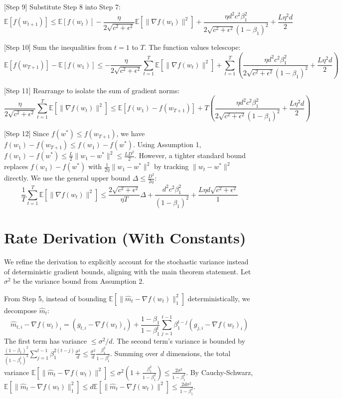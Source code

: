 \documentclass{article}
\begin{document}
[Step 9] Substitute Step 8 into Step 7:
$$ \mathbb{E}[f(w_{t+1})] \leq \mathbb{E}[f(w_t)] - \frac{\eta}{2\sqrt{c^2+\epsilon^2}} \mathbb{E}[\|\nabla f(w_t)\|^2] + \frac{\eta d^2 c^2 \beta_1^2}{2\sqrt{c^2+\epsilon^2}(1-\beta_1)^2} + \frac{L \eta^2 d}{2} $$

[Step 10] Sum the inequalities from $t=1$ to $T$. The function values telescope:
$$ \mathbb{E}[f(w_{T+1})] - \mathbb{E}[f(w_1)] \leq - \frac{\eta}{2\sqrt{c^2+\epsilon^2}} \sum_{t=1}^T \mathbb{E}[\|\nabla f(w_t)\|^2] + \sum_{t=1}^T \left( \frac{\eta d^2 c^2 \beta_1^2}{2\sqrt{c^2+\epsilon^2}(1-\beta_1)^2} + \frac{L \eta^2 d}{2} \right) $$

[Step 11] Rearrange to isolate the sum of gradient norms:
$$ \frac{\eta}{2\sqrt{c^2+\epsilon^2}} \sum_{t=1}^T \mathbb{E}[\|\nabla f(w_t)\|^2] \leq \mathbb{E}[f(w_1) - f(w_{T+1})] + T \left( \frac{\eta d^2 c^2 \beta_1^2}{2\sqrt{c^2+\epsilon^2}(1-\beta_1)^2} + \frac{L \eta^2 d}{2} \right) $$

[Step 12] Since $f(w^*) \leq f(w_{T+1})$, we have $f(w_1) - f(w_{T+1}) \leq f(w_1) - f(w^*)$. Using Assumption 1, $f(w_1) - f(w^*) \leq \frac{L}{2} \|w_1 - w^*\|^2 \leq \frac{L D^2}{2}$. However, a tighter standard bound replaces $f(w_1)-f(w^*)$ with $\frac{1}{2\eta} \|w_1 - w^*\|^2$ by tracking $\|w_t - w^*\|^2$ directly. We use the general upper bound $\Delta \leq \frac{D^2}{2\eta}$:
$$ \frac{1}{T} \sum_{t=1}^T \mathbb{E}[\|\nabla f(w_t)\|^2] \leq \frac{2\sqrt{c^2+\epsilon^2}}{\eta T} \Delta + \frac{d^2 c^2 \beta_1^2}{(1-\beta_1)^2} + \frac{L \eta d \sqrt{c^2+\epsilon^2}}{1} $$

\section*{Rate Derivation (With Constants)}

We refine the derivation to explicitly account for the stochastic variance instead of deterministic gradient bounds, aligning with the main theorem statement. Let $\sigma^2$ be the variance bound from Assumption 2.

From Step 5, instead of bounding $\mathbb{E}[\|\hat{m}_t - \nabla f(w_t)\|_1^2]$ deterministically, we decompose $\hat{m}_t$:
$$ \hat{m}_{t,i} - \nabla f(w_t)_i = (g_{t,i} - \nabla f(w_t)_i) + \frac{1-\beta_1}{1-\beta_1^t} \sum_{j=1}^{t-1} \beta_1^{t-j} (g_{j,i} - \nabla f(w_t)_i) $$
The first term has variance $\leq \sigma^2/d$. The second term's variance is bounded by $\frac{(1-\beta_1)^2}{(1-\beta_1^t)^2} \sum_{j=1}^{t-1} \beta_1^{2(t-j)} \frac{\sigma^2}{d} \leq \frac{\sigma^2}{d} \frac{\beta_1^2}{1-\beta_1^2}$. 
Summing over $d$ dimensions, the total variance $\mathbb{E}[\|\hat{m}_t - \nabla f(w_t)\|^2] \leq \sigma^2 (1 + \frac{\beta_1^2}{1-\beta_1^2}) \leq \frac{2\sigma^2}{1-\beta_1^2}$. 
By Cauchy-Schwarz, $\mathbb{E}[\|\hat{m}_t - \nabla f(w_t)\|_1^2] \leq d \mathbb{E}[\|\hat{m}_t - \nabla f(w_t)\|^2] \leq \frac{2d\sigma^2}{1-\beta_1^2}$.
\end{document}
